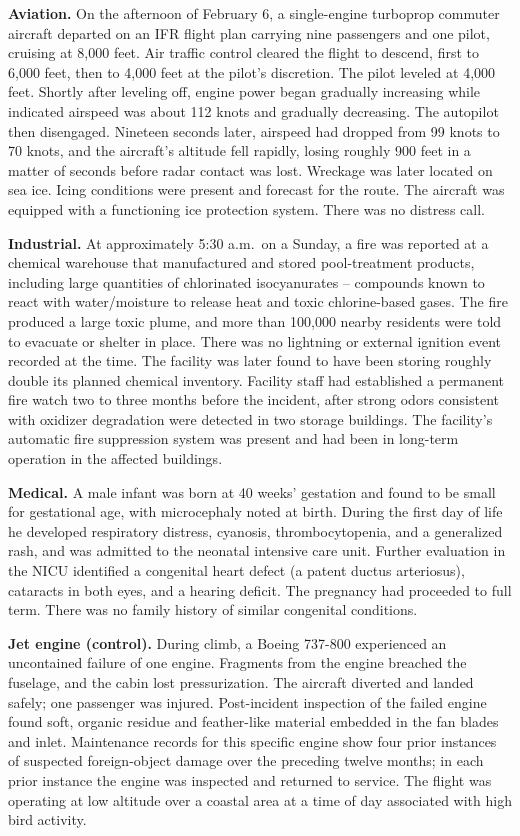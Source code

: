 \documentclass[11pt]{article}
\begin{document}
\textbf{Aviation.} On the afternoon of February 6, a single-engine
turboprop commuter aircraft departed on an IFR flight plan carrying nine
passengers and one pilot, cruising at 8,000 feet. Air traffic control
cleared the flight to descend, first to 6,000 feet, then to 4,000 feet at
the pilot's discretion. The pilot leveled at 4,000 feet. Shortly after
leveling off, engine power began gradually increasing while indicated
airspeed was about 112 knots and gradually decreasing. The autopilot then
disengaged. Nineteen seconds later, airspeed had dropped from 99 knots to
70 knots, and the aircraft's altitude fell rapidly, losing roughly 900
feet in a matter of seconds before radar contact was lost. Wreckage was
later located on sea ice. Icing conditions were present and forecast for
the route. The aircraft was equipped with a functioning ice protection
system. There was no distress call.

\textbf{Industrial.} At approximately 5:30 a.m.\ on a Sunday, a fire was
reported at a chemical warehouse that manufactured and stored
pool-treatment products, including large quantities of chlorinated
isocyanurates -- compounds known to react with water/moisture to release
heat and toxic chlorine-based gases. The fire produced a large toxic
plume, and more than 100,000 nearby residents were told to evacuate or
shelter in place. There was no lightning or external ignition event
recorded at the time. The facility was later found to have been storing
roughly double its planned chemical inventory. Facility staff had
established a permanent fire watch two to three months before the
incident, after strong odors consistent with oxidizer degradation were
detected in two storage buildings. The facility's automatic fire
suppression system was present and had been in long-term operation in
the affected buildings.

\textbf{Medical.} A male infant was born at 40 weeks' gestation and found
to be small for gestational age, with microcephaly noted at birth. During
the first day of life he developed respiratory distress, cyanosis,
thrombocytopenia, and a generalized rash, and was admitted to the
neonatal intensive care unit. Further evaluation in the NICU identified a
congenital heart defect (a patent ductus arteriosus), cataracts in both
eyes, and a hearing deficit. The pregnancy had proceeded to full term.
There was no family history of similar congenital conditions.

\textbf{Jet engine (control).} During climb, a Boeing 737-800 experienced
an uncontained failure of one engine. Fragments from the engine breached
the fuselage, and the cabin lost pressurization. The aircraft diverted and
landed safely; one passenger was injured. Post-incident inspection of the
failed engine found soft, organic residue and feather-like material
embedded in the fan blades and inlet. Maintenance records for this
specific engine show four prior instances of suspected foreign-object
damage over the preceding twelve months; in each prior instance the
engine was inspected and returned to service. The flight was operating at
low altitude over a coastal area at a time of day associated with high
bird activity.
\end{document}
